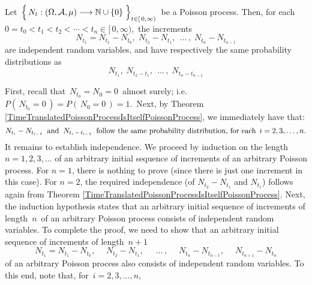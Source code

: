 \vskip 0.5cm
\begin{theorem}\label{PoissonProcessHasIndependentIncrements}
\mbox{}
\vskip 0.15cm
\noindent
Let
\,$\left\{\,N_{t} : (\Omega,\mathcal{A},\mu) \overset{{\color{white}-}}{\longrightarrow} \N\cup\{0\} \;\right\}_{t \in [\,0,\infty)}$\,
be a Poisson process.
Then, for each \,$0 = t_{0} < t_{1} < t_{2} < \cdots < t_{n} \in [\,0,\infty)$,\,
the increments
\begin{equation*}
N_{t_{1}} = N_{t_{1}} - N_{t_{0}},\;
N_{t_{2}} - N_{t_{1}},\;
\,\ldots\,,\;
N_{t_{n}} - N_{t_{n-1}}
\end{equation*}
are independent random variables, and have respectively the same probability distributions as
\begin{equation*}
N_{t_{1}},\;
N_{t_{2} - t_{1}},\;
\,\ldots\,,\;
N_{t_{n} - t_{n-1}}
\end{equation*}
\end{theorem}
\proof
First, recall that \,$N_{t_{0}} = N_{0} = 0$\, almost surely;
i.e. \,$P(\,N_{t_{0}} = 0\,) = P(\,N_{0} = 0\,) = 1$.\,
Next, by Theorem \ref{TimeTranslatedPoissonProcessIsItselfPoissonProcess},
we immediately have that:
\begin{equation*}
N_{t_{i}} - N_{t_{i-1}}
\;\;\textnormal{and}\;\;
N_{t_{i} \,-\, t_{i-1}}
\;\;\textnormal{follow the same probability distribution, for each \,$i = 2, 3, \ldots, n$}.
\end{equation*}
It remains to establish independence.
We proceed by induction on the length $n = 1, 2, 3, \ldots $ of an arbitrary initial sequence of
increments of an arbitrary Poisson process.
For $n =1$, there is nothing to prove (since there is just one increment in this case).
For $n = 2$, the required independence (of $N_{t_{2}} - N_{t_{1}}$ and $N_{t_{1}}$)
follows again from Theorem \ref{TimeTranslatedPoissonProcessIsItselfPoissonProcess}.
Next, the induction hypothesis states that
an arbitrary initial sequence of increments of length \,$n$\, of an arbitrary Poisson process
consists of independent random variables.
To complete the proof, we need to show that 
an arbitrary initial sequence of increments of length \,$n+1$
\begin{equation}\label{initialIncrementSequenceLengthNplusOne}
N_{t_{1}} = N_{t_{1}} - N_{t_{0}},\;
\quad
N_{t_{2}} - N_{t_{1}},\;
\quad
\,\ldots\,,\;
\quad
N_{t_{n}} - N_{t_{n-1}},\;
\quad
N_{t_{n+1}} - N_{t_{n}}
\end{equation}
of an arbitrary Poisson process also consists of independent random variables.
To this end, note that, for \,$i = 2, 3, \ldots, n$,

